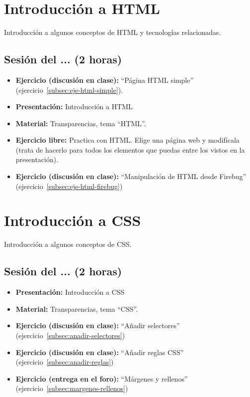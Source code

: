\documentclass[a4paper,12pt]{report}
\begin{document}
\section{Introducción a HTML}

Introducción a algunos conceptos de HTML y tecnologías relacionadas.

\subsection{Sesión del ... (2 horas)}

\begin{itemize}
\item \textbf{Ejercicio (discusión en clase):} ``Página HTML simple'' (ejercicio~\ref{subsec:eje-html-simple}).
\item \textbf{Presentación:} Introducción a HTML
\item \textbf{Material:} Transparencias, tema ``HTML''.
\item \textbf{Ejercicio libre:} Practica con HTML. Elige una página web y modifícala (trata de hacerlo para todos los elementos que puedas entre los vistos en la presentación).
\item \textbf{Ejercicio (discusión en clase):} ``Manipulación de HTML desde Firebug'' (ejercicio~\ref{subsec:eje-html-firebug})
\end{itemize}

\section{Introducción a CSS}

Introducción a algunos conceptos de CSS.

\subsection{Sesión del ... (2 horas)}

\begin{itemize}
\item \textbf{Presentación:} Introducción a CSS
\item \textbf{Material:} Transparencias, tema ``CSS''.
\item \textbf{Ejercicio (discusión en clase):} ``Añadir selectores'' (ejercicio~\ref{subsec:anadir-selectores})
\item \textbf{Ejercicio (discusión en clase):} ``Añadir reglas CSS'' (ejercicio~\ref{subsec:anadir-reglas})
\item \textbf{Ejercicio (entrega en el foro):} ``Márgenes y rellenos'' (ejercicio~\ref{subsec:margenes-rellenos})
\end{itemize}
\end{document}
